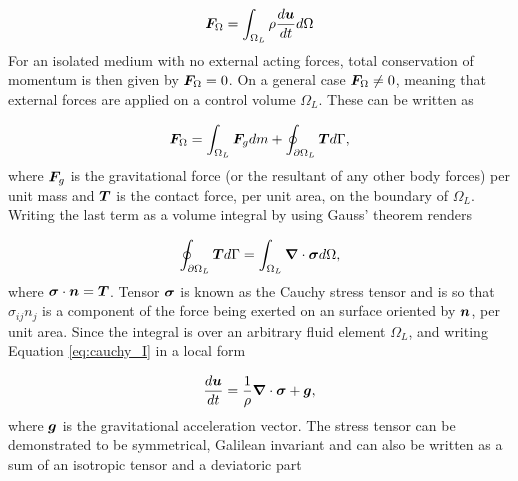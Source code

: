 %
	\begin{equation} \label{eq:ns_VII}
		\boldsymbol{F}_\Omega =  \int_{\Omega_L} \rho\frac{d\boldsymbol{u}}{dt}  d\Omega
	\end{equation}
%
For an isolated medium with no external acting forces, total conservation of momentum is then given by $\boldsymbol{F}_\Omega=0$. On a general case $\boldsymbol{F}_\Omega \neq 0$, meaning that external forces are applied on a control volume $\Omega_L$. These can be written as

%
	\begin{equation} \label{eq:cauchy_I}
		\boldsymbol{F}_\Omega = \int_{\Omega_L} \boldsymbol{F}_g dm + \oint_{\partial \Omega_L} \boldsymbol{T} d\Gamma,
	\end{equation}
%
where $\boldsymbol{F}_g$ is the gravitational force (or the resultant of any other body forces) per unit mass and $\boldsymbol{T}$ is the contact force, per unit area, on the boundary of $\Omega_L$. Writing the last term as a volume integral by using Gauss' theorem renders

%
	\begin{equation} \label{eq:cauchy_II}
		\oint_{\partial {\Omega_L}} \boldsymbol{T} d\Gamma = \int_{\Omega_L} \boldsymbol{\nabla}  \cdot \boldsymbol{\sigma} d\Omega,
	\end{equation}
%
where $ \boldsymbol{\sigma}\cdot\boldsymbol{n}=\boldsymbol{T} $. Tensor $\boldsymbol{\sigma}$ is known as the Cauchy stress tensor and is so that $\sigma_{ij}n_{j}$ is a component of the force being exerted on an surface oriented by $\boldsymbol{n}$, per unit area. %
Since the integral is over an arbitrary fluid element $\Omega_L$, and writing Equation \eqref{eq:cauchy_I} in a local form 

%
	\begin{equation} \label{eq:cauchy_III}
		\frac{d\boldsymbol{u}}{dt}=\frac{1}{\rho}\boldsymbol{\nabla} \cdot\boldsymbol{\sigma} + \boldsymbol{g},
	\end{equation}
%
where $\boldsymbol{g}$ is the gravitational acceleration vector. The stress tensor can be demonstrated to be symmetrical, Galilean invariant \citep{Aris-1962} and can also be written as a sum of an isotropic tensor and a deviatoric part

